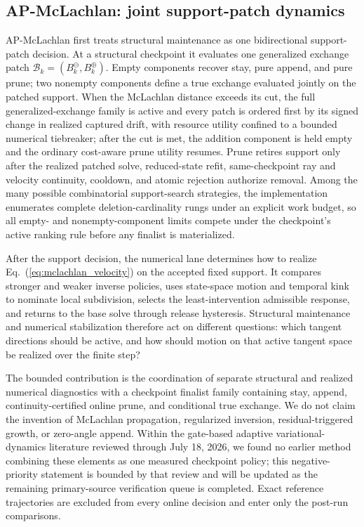 \documentclass[
  reprint,
  amsmath,
  amssymb,
  aps,
  pra,
  nofootinbib,
  superscriptaddress,
  floatfix
]{revtex4-2}
\begin{document}
\subsection{AP-McLachlan: joint support-patch dynamics}
AP-McLachlan first treats structural maintenance as one bidirectional support-patch decision.  At a structural checkpoint it evaluates one generalized exchange patch $\mathcal B_k=(B_k^{\ominus},B_k^{\oplus})$.  Empty components recover stay, pure append, and pure prune; two nonempty components define a true exchange evaluated jointly on the patched support.  When the McLachlan distance exceeds its cut, the full generalized-exchange family is active and every patch is ordered first by its signed change in realized captured drift, with resource utility confined to a bounded numerical tiebreaker; after the cut is met, the addition component is held empty and the ordinary cost-aware prune utility resumes.  Prune retires support only after the realized patched solve, reduced-state refit, same-checkpoint ray and velocity continuity, cooldown, and atomic rejection authorize removal.  Among the many possible combinatorial support-search strategies, the implementation enumerates complete deletion-cardinality rungs under an explicit work budget, so all empty- and nonempty-component limits compete under the checkpoint's active ranking rule before any finalist is materialized.

After the support decision, the numerical lane determines how to realize Eq.~(\ref{eq:mclachlan_velocity}) on the accepted fixed support.  It compares stronger and weaker inverse policies, uses state-space motion and temporal kink to nominate local subdivision, selects the least-intervention admissible response, and returns to the base solve through release hysteresis.  Structural maintenance and numerical stabilization therefore act on different questions: which tangent directions should be active, and how should motion on that active tangent space be realized over the finite step?

The bounded contribution is the coordination of separate structural and realized numerical diagnostics with a checkpoint finalist family containing stay, append, continuity-certified online prune, and conditional true exchange.  We do not claim the invention of McLachlan propagation, regularized inversion, residual-triggered growth, or zero-angle append.  Within the gate-based adaptive variational-dynamics literature reviewed through July 18, 2026, we found no earlier method combining these elements as one measured checkpoint policy; this negative-priority statement is bounded by that review and will be updated as the remaining primary-source verification queue is completed.  Exact reference trajectories are excluded from every online decision and enter only the post-run comparisons.
\end{document}
